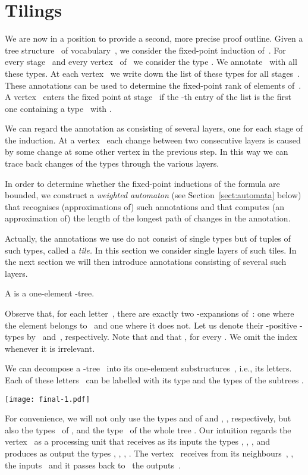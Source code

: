 \documentclass{LMCS}
\begin{document}
\section{Tilings}
\label{sect:tilings}


We are now in a position to provide a second, more precise proof outline.
Given a tree structure~ of vocabulary~,
we consider the fixed-point induction of~.
For every stage~ and every vertex~ of~
we consider the type .
We annotate~ with all these types.
At each vertex~ we write down the list of these types for all stages~.
These annotations can be used to determine the fixed-point rank of elements of~.
A vertex~ enters the fixed point at stage~ if the -th entry
of the list is the first one containing a type~ with .

We can regard the annotation as consisting of several layers, one for each stage of the
induction. At a vertex~ each change between two consecutive layers is caused
by some change at some other vertex in the previous step. In this way we can trace
back changes of the types through the various layers.

In order to determine whether the fixed-point inductions of the formula are bounded,
we construct a \emph{weighted automaton} (see Section~\ref{sect:automata} below)
that recognises (approximations of) such annotations and that computes
(an approximation of) the length of the longest path of changes in the annotation.

Actually, the annotations we use do not consist of single types but
of tuples of such types, called a \emph{tile.}
In this section we consider single layers of such tiles.
In the next section we will then introduce annotations
consisting of several such layers.

\begin{defi}
A  is a one-element -tree.
\end{defi}
Observe that, for each letter~,
there are exactly two -expansions of~\?:
one where the element belongs to~ and one where it does not.
Let us denote their -positive -types
by ~and~, respectively.
Note that  and that ,
for every . We omit the index~ whenever it is irrelevant.

We can decompose a -tree~ into its one-element
substructures~, i.e., its letters.
Each of these letters~ can be labelled with
its type and the types of the subtrees .
\begin{center}
\texttt{[image: final-1.pdf]}
\end{center}
For convenience, we will not only use the types  and 
of  and , , respectively,
but also the types~ of , 
and the type~ of the whole tree .
Our intuition regards the vertex~ as a processing unit
that receives as its inputs the types , , , 
and produces as output the types , , , .
The vertex~ receives from its neighbours~, ,
the inputs~ and it passes back to~ the outputs~.
\end{document}
